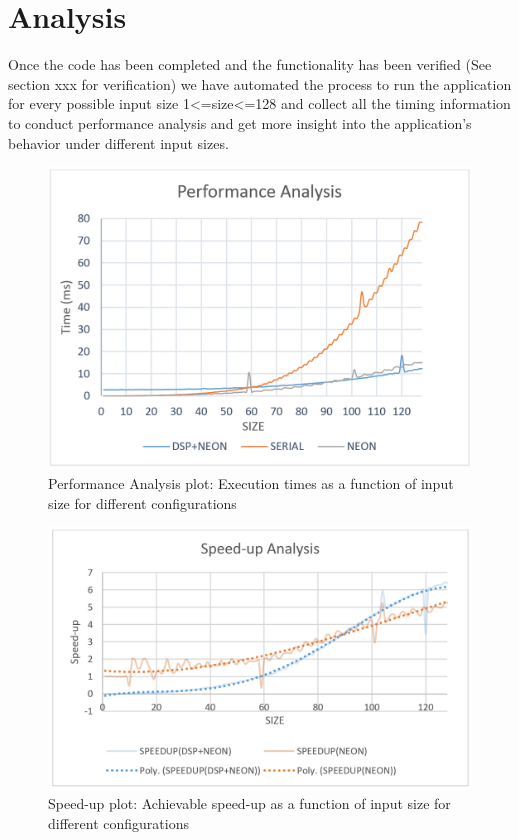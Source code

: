 \section{Analysis}

Once the code has been completed and the functionality has been verified (See section xxx for verification) we have automated the process to run the application for every possible input size 1<=size<=128 and collect all the timing information to conduct performance analysis and get more insight into the application's behavior under different input sizes.



\begin{figure}[h!]
\includegraphics[width=\textwidth]{analysis/perf_plot}
\caption{Performance Analysis plot: Execution times as a function of input size for different configurations}
\label{fig:perf_plot}
\end{figure}


\begin{figure}[h!]
\includegraphics[width=\textwidth]{analysis/speedup_plot}
\caption{Speed-up plot: Achievable speed-up as a function of input size for different configurations}
\label{fig:speedup_plot}
\end{figure}

